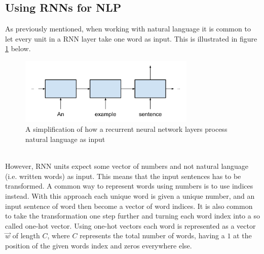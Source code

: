 \subsection{Using RNNs for NLP}\label{sec:rnn_nlp}
As previously mentioned, when working with natural language it is common to let every unit in a RNN layer take one word as input. This is illustrated in figure \ref{fig:sentence_to_rnn} below.
\begin{figure}[h]
    \centering
    \includegraphics[width=0.75\textwidth]{figure/ann/sentence_to_rnn}
    \caption{A simplification of how a recurrent neural network layers process natural language as input}
    \label{fig:sentence_to_rnn}
\end{figure}
\\
However, RNN units expect some vector of numbers and not natural language (i.e. written words) as input. This means that the input sentences has to be transformed. A common way to represent words using numbers is to use indices instead. With this approach each unique word is given a unique number, and an input sentence of word then become a vector of word indices. It is also common to take the transformation one step further and turning each word index into a so called one-hot vector\parencite{turian2010word}. Using one-hot vectors each word is represented as a vector $\vec{w}$ of length $C$, where $C$ represents the total number of words, having a $1$ at the position of the given words index and zeros everywhere else.
